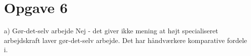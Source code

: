 \section{Opgave 6}

\begin{frame}{a) Gør-det-selv arbejde}
Nej - det giver ikke mening at højt specialiseret arbejdskraft laver gør-det-selv arbejde. Det har håndværkere komparative fordele i.
\end{frame}
